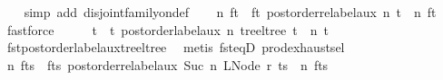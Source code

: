 \begin{isabellebody}
\ {}{\isacharparenleft}{\kern0pt}{}{\isacharparenright}{\kern0pt}\ \isamarkupfalse%
\ {\isacharparenleft}{\kern0pt}simp\ add{\isacharcolon}{\kern0pt}\ disjoint{\isacharunderscore}{\kern0pt}family{\isacharunderscore}{\kern0pt}on{\isacharunderscore}{\kern0pt}def{\isacharparenright}{\kern0pt}\isanewline
\ \ \isamarkupfalse%
\ n{\isacharprime}{\kern0pt}\ f{\isacharunderscore}{\kern0pt}t\ \ f{\isacharunderscore}{\kern0pt}t{\isacharcolon}{\kern0pt}\ {\isachardoublequoteopen}postorder{\isacharunderscore}{\kern0pt}relabel{\isacharunderscore}{\kern0pt}aux\ n\ t\ {\isacharequal}{\kern0pt}\ {\isacharparenleft}{\kern0pt}n{\isacharprime}{\kern0pt}{\isacharcomma}{\kern0pt}\ f{\isacharunderscore}{\kern0pt}t{\isacharparenright}{\kern0pt}{\isachardoublequoteclose}\ \isamarkupfalse%
\ fastforce\isanewline
\ \ \isamarkupfalse%
\ \isamarkupfalse%
\ t{\isacharprime}{\kern0pt}\ \ t{\isacharprime}{\kern0pt}{\isacharcolon}{\kern0pt}\ {\isachardoublequoteopen}postorder{\isacharunderscore}{\kern0pt}label{\isacharunderscore}{\kern0pt}aux\ n\ {\isacharparenleft}{\kern0pt}tree{\isacharunderscore}{\kern0pt}ltree\ t{\isacharparenright}{\kern0pt}\ {\isacharequal}{\kern0pt}\ {\isacharparenleft}{\kern0pt}n{\isacharprime}{\kern0pt}{\isacharcomma}{\kern0pt}\ t{\isacharprime}{\kern0pt}{\isacharparenright}{\kern0pt}{\isachardoublequoteclose}\isanewline
\ \ \ \ \isamarkupfalse%
\ fst{\isacharunderscore}{\kern0pt}postorder{\isacharunderscore}{\kern0pt}label{\isacharunderscore}{\kern0pt}aux{\isacharunderscore}{\kern0pt}tree{\isacharunderscore}{\kern0pt}ltree\ \isamarkupfalse%
\ {\isacharparenleft}{\kern0pt}metis\ fst{\isacharunderscore}{\kern0pt}eqD\ prod{\isachardot}{\kern0pt}exhaust{\isacharunderscore}{\kern0pt}sel{\isacharparenright}{\kern0pt}\isanewline
\ \ \isamarkupfalse%
\ n{\isacharprime}{\kern0pt}{\isacharprime}{\kern0pt}\ f{\isacharunderscore}{\kern0pt}ts\ \ f{\isacharunderscore}{\kern0pt}ts{\isacharcolon}{\kern0pt}\ {\isachardoublequoteopen}postorder{\isacharunderscore}{\kern0pt}relabel{\isacharunderscore}{\kern0pt}aux\ {\isacharparenleft}{\kern0pt}Suc\ n{\isacharprime}{\kern0pt}{\isacharparenright}{\kern0pt}\ {\isacharparenleft}{\kern0pt}LNode\ r\ ts{\isacharparenright}{\kern0pt}\ {\isacharequal}{\kern0pt}\ {\isacharparenleft}{\kern0pt}n{\isacharprime}{\kern0pt}{\isacharprime}{\kern0pt}{\isacharcomma}{\kern0pt}\ f{\isacharunderscore}{\kern0pt}ts{\isacharparenright}{\kern0pt}{\isachardoublequoteclose}\ \isamarkupfalse%

\end{isabellebody}
